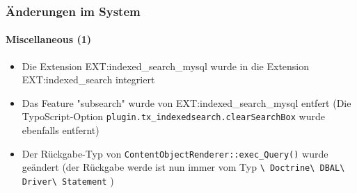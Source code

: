 
\begin{frame}[fragile]
	\frametitle{Änderungen im System}
	\framesubtitle{Miscellaneous (1)}

	\begin{itemize}

		\item Die Extension EXT:indexed\_search\_mysql wurde in die Extension EXT:indexed\_search integriert

		\item Das Feature "subsearch" wurde von EXT:indexed\_search\_mysql entfert\newline
			\smaller
				(Die TypoScript-Option \texttt{plugin.tx\_indexedsearch.clearSearchBox} wurde ebenfalls entfernt)
			\normalsize

		\item Der Rückgabe-Typ von \texttt{ContentObjectRenderer::exec\_Query()} wurde geändert\newline
			\smaller
				(der Rückgabe werde ist nun immer vom Typ
					\texttt{\textbackslash
						Doctrine\textbackslash
						DBAL\textbackslash
						Driver\textbackslash
						Statement}
					)
			\normalsize

	\end{itemize}

\end{frame}

